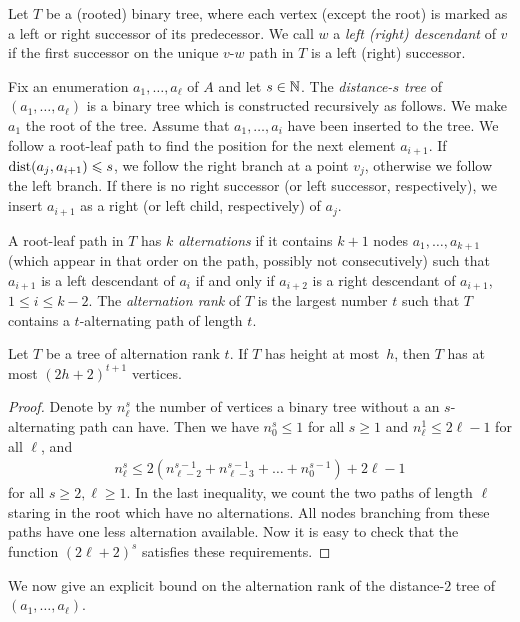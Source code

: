 Let $T$ be a (rooted) binary tree, where each vertex (except the root) is 
marked as a left or right successor of its predecessor. We call $w$ 
a \emph{left (right) descendant} of $v$ if the first successor on the unique
$v$-$w$ path in $T$ is a left (right) successor.

Fix an enumeration $a_1,\ldots, a_{\ell}$ of $A$ and let $s\in \mathbb{N}$. 
The \emph{distance-$s$ tree}
of $(a_1,\ldots,a_{\ell})$ is a binary tree which is constructed recursively as 
follows. We make $a_1$ the root of the tree. Assume that $a_1,\ldots, a_i$
have been inserted to the tree. We follow a root-leaf path to find the
position for the next element $a_{i+1}$. If $\mathrm{dist}(a_j,a_{i+1})\leqslant s$, we
follow the right branch at a point $v_j$, otherwise we follow the left branch. If 
there is no right successor (or left successor, respectively), we insert $a_{i+1}$ 
as a right (or left child, respectively) of $a_j$. 

A root-leaf path in $T$ has \emph{$k$ alternations} 
if it contains $k+1$ nodes $a_1,\ldots, a_{k+1}$ (which appear
in that order on the path, possibly not consecutively) such that $a_{i+1}$ is a left descendant of $a_i$
if and only if $a_{i+2}$ is a right descendant of $a_{i+1}$, $1\leq i\leq k-2$. 
The \emph{alternation rank} of $T$ is the largest number $t$ such that 
$T$ contains a $t$-alternating path of length $t$.

\begin{lemma}\label{lem:number-of-nodes}
Let $T$ be a tree of alternation rank $t$. If
$T$ has height at most~$h$, then $T$ has at most $(2h+2)^{t+1}$
vertices. 
\end{lemma}
\begin{proof}
Denote by $n_\ell^s$ the number of vertices a binary tree without a 
an $s$-alternating path can have. Then we have $n_0^s\leq 1$ for all $s\geq 1$
and $n_\ell^1\leq 2\ell-1$ for all $\ell$, and 
\begin{align*}
n_\ell^s\leq 2(n_{\ell-2}^{s-1}+n_{\ell-3}^{s-1}+\ldots + n_{0}^{s-1})+2\ell-1
\end{align*}
for all $s\geq 2,\ell\geq 1$. In the last inequality, we count the two paths of length
$\ell$ staring in the root which have no alternations. All nodes branching from 
these paths have one less alternation available. 
Now it is easy to check that the function $(2\ell+2)^s$ satisfies these requirements. 
\end{proof}


We now give an explicit bound on the alternation rank of the distance-$2$ 
tree of $(a_1,\ldots, a_\ell)$. 

